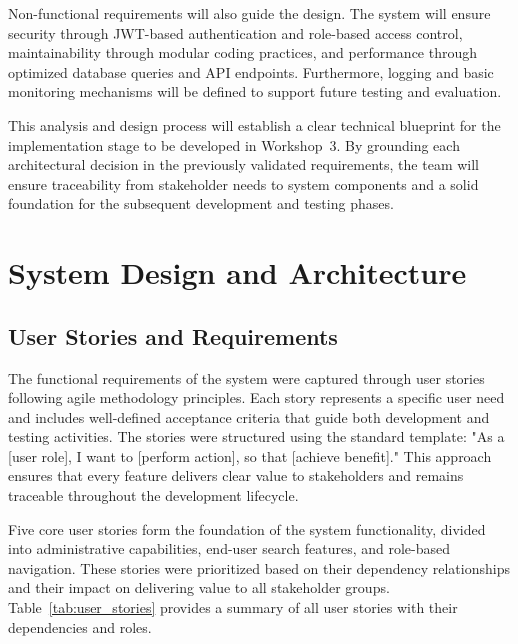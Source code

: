 \documentclass[12pt,a4paper]{article}
\begin{document}
Non-functional requirements will also guide the design. The system will ensure security through JWT-based authentication and role-based access control, maintainability through modular coding practices, and performance through optimized database queries and API endpoints. Furthermore, logging and basic monitoring mechanisms will be defined to support future testing and evaluation.\newline

This analysis and design process will establish a clear technical blueprint for the implementation stage to be developed in Workshop~3. By grounding each architectural decision in the previously validated requirements, the team will ensure traceability from stakeholder needs to system components and a solid foundation for the subsequent development and testing phases.


\section{System Design and Architecture}
\label{sec:design}


\subsection{User Stories and Requirements}

The functional requirements of the system were captured through user stories following agile methodology principles. Each story represents a specific user need and includes well-defined acceptance criteria that guide both development and testing activities. The stories were structured using the standard template: "As a [user role], I want to [perform action], so that [achieve benefit]." This approach ensures that every feature delivers clear value to stakeholders and remains traceable throughout the development lifecycle.\newline

Five core user stories form the foundation of the system functionality, divided into administrative capabilities, end-user search features, and role-based navigation. These stories were prioritized based on their dependency relationships and their impact on delivering value to all stakeholder groups. Table~\ref{tab:user_stories} provides a summary of all user stories with their dependencies and roles.\newline
\end{document}
